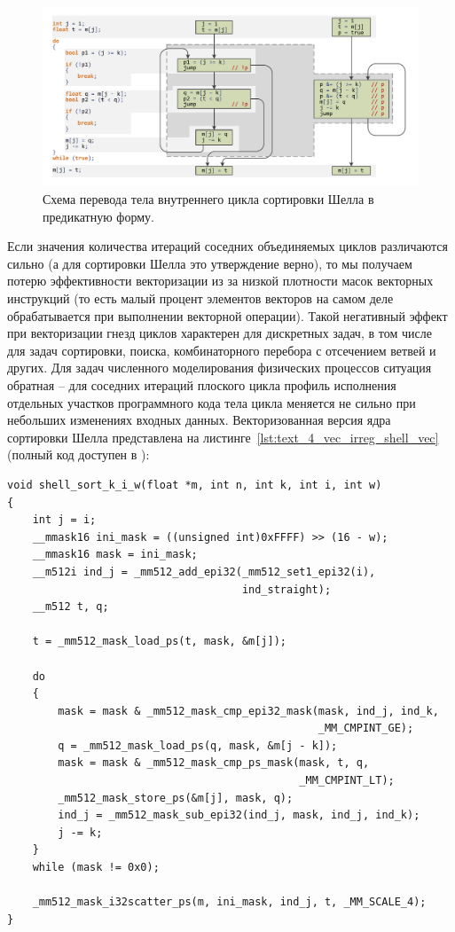 \begin{figure}[ht]
\centering
\includegraphics[width=1.0\textwidth]{fig/vec_shell_cfg.pdf}
\singlespacing
{}\caption{Схема перевода тела внутреннего цикла сортировки Шелла в предикатную форму.}
\label{fig:text_4_vec_irreg_shell_cfg}
\end{figure}

Если значения количества итераций соседних объединяемых циклов различаются сильно (а для сортировки Шелла это утверждение верно), то мы получаем потерю эффективности векторизации из за низкой плотности масок векторных инструкций (то есть малый процент элементов векторов на самом деле обрабатывается при выполнении векторной операции).
Такой негативный эффект при векторизации гнезд циклов характерен для дискретных задач, в том числе для задач сортировки, поиска, комбинаторного перебора с отсечением ветвей и других.
Для задач численного моделирования физических процессов ситуация обратная -- для соседних итераций плоского цикла профиль исполнения отдельных участков программного кода тела цикла меняется не сильно при небольших изменениях входных данных.
Векторизованная версия ядра сортировки Шелла представлена на листинге~\ref{lst:text_4_vec_irreg_shell_vec} (полный код доступен в \cite{iparGithub}):

\begin{lstlisting}[caption={Векторизованный вариант ядра сортировки Шелла.},label={lst:text_4_vec_irreg_shell_vec}]
void shell_sort_k_i_w(float *m, int n, int k, int i, int w)
{
    int j = i;
    __mmask16 ini_mask = ((unsigned int)0xFFFF) >> (16 - w);
    __mmask16 mask = ini_mask;
    __m512i ind_j = _mm512_add_epi32(_mm512_set1_epi32(i),
                                     ind_straight);
    __m512 t, q;

    t = _mm512_mask_load_ps(t, mask, &m[j]);

    do
    {
        mask = mask & _mm512_mask_cmp_epi32_mask(mask, ind_j, ind_k,
                                                 _MM_CMPINT_GE);
        q = _mm512_mask_load_ps(q, mask, &m[j - k]);
        mask = mask & _mm512_mask_cmp_ps_mask(mask, t, q,
                                              _MM_CMPINT_LT);
        _mm512_mask_store_ps(&m[j], mask, q);
        ind_j = _mm512_mask_sub_epi32(ind_j, mask, ind_j, ind_k);
        j -= k;
    }
    while (mask != 0x0);

    _mm512_mask_i32scatter_ps(m, ini_mask, ind_j, t, _MM_SCALE_4);
}
\end{lstlisting}

